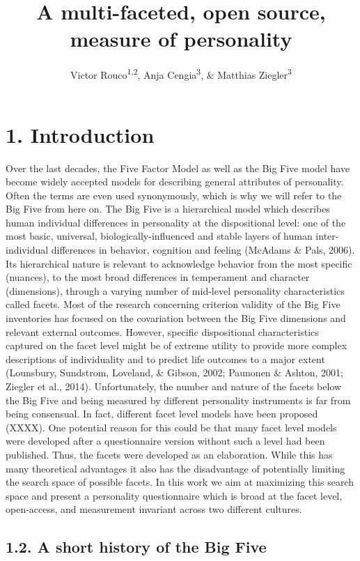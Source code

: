 \documentclass[,man,floatsintext]{apa6}
\title{A multi-faceted, open source, measure of personality}
\author{Victor Rouco\textsuperscript{1,2}, Anja Cengia\textsuperscript{3}, \&
Matthias Ziegler\textsuperscript{3}}
\date{}
\affiliation{
\vspace{0.5cm}
\textsuperscript{1} Universitat de Barcelona\\\textsuperscript{2} Institut de Neurociencies Barcelona\\\textsuperscript{3} Humboldt Universität zu Berlin}
\theoremstyle{definition}
\theoremstyle{definition}
\theoremstyle{definition}
\theoremstyle{remark}
\begin{document}
\maketitle

\hypertarget{introduction}{%
\section{1. Introduction}\label{introduction}}

Over the last decades, the Five Factor Model as well as the Big Five
model have become widely accepted models for describing general
attributes of personality. Often the terms are even used synonymously,
which is why we will refer to the Big Five from here on. The Big Five is
a hierarchical model which describes human individual differences in
personality at the dispositional level: one of the most basic,
universal, biologically-influenced and stable layers of human
inter-individual differences in behavior, cognition and feeling (McAdams
\& Pals, 2006). Its hierarchical nature is relevant to acknowledge
behavior from the most specific (nuances), to the most broad differences
in temperament and character (dimensions), through a varying number of
mid-level personality characteristics called facets. Most of the
research concerning criterion validity of the Big Five inventories has
focused on the covariation between the Big Five dimensions and relevant
external outcomes. However, specific dispositional characteristics
captured on the facet level might be of extreme utility to provide more
complex descriptions of individuality and to predict life outcomes to a
major extent (Lounsbury, Sundstrom, Loveland, \& Gibson, 2002; Paunonen
\& Ashton, 2001; Ziegler et al., 2014). Unfortunately, the number and
nature of the facets below the Big Five and being measured by different
personality instruments is far from being consensual. In fact, different
facet level models have been proposed (XXXX). One potential reason for
this could be that many facet level models were developed after a
questionnaire version without such a level had been published. Thus, the
facets were developed as an elaboration. While this has many theoretical
advantages it also has the disadvantage of potentially limiting the
search space of possible facets. In this work we aim at maximizing this
search space and present a personality questionnaire which is broad at
the facet level, open-access, and measurement invariant across two
different cultures.

\hypertarget{a-short-history-of-the-big-five}{%
\subsection{1.2. A short history of the Big
Five}\label{a-short-history-of-the-big-five}}
\end{document}
